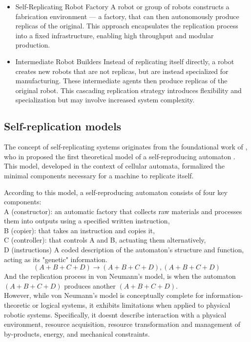 \begin{itemize}
    \item Self-Replicating Robot Factory
        A robot or group of robots constructs a fabrication environment — a factory, 
        that can then autonomously produce replicas of the original.
        This approach encapsulates the replication process into a fixed 
        infrastructure, enabling high throughput and modular production.
    \item Intermediate Robot Builders
        Instead of replicating itself directly, a robot creates new robots 
        that are not replicas, but are instead specialized for manufacturing. 
        These intermediate agents then produce replicas of the original robot. 
        This cascading replication strategy introduces flexibility and specialization 
        but may involve increased system complexity.

\end{itemize}




\subsection{Self-replication models}
The concept of self-replicating systems originates from the foundational work of 
\citeauthor{vonNeumann1962Theory}, who in \citeyear{vonNeumann1962Theory} proposed 
the first theoretical model of a self-reproducing automaton \cite{vonNeumann1962Theory}. 
This model, developed in the context of cellular automata, 
formalized the minimal components necessary for a machine to replicate itself.

According to this model, a self-reproducing automaton consists of four key components:\\
A (constructor): an automatic factory  that collects raw materials and processes them into outputs using a
specified written instruction, \\
B (copier): that takes an instruction and copies it,\\
C (controller): that controls A and B, actuating them alternatively,\\
D (instructions) A coded description of the automaton's structure and function, acting as its "genetic" information.\\
\[ (A + B + C + D) \rightarrow (A + B + C + D), (A + B + C + D) \]
And the replication process in von Neumann’s model, is when the automaton 
$ (A + B + C + D) $ produces another $ (A + B + C + D) $.\\
However, while von Neumann's model is conceptually complete for information-theoretic 
or logical systems, it exhibits limitations when applied to physical robotic systems. 
Specifically, it doesnt describe interaction with a physical environment, resource acquisition,
resource transformation and management of by-products, energy, and mechanical constraints.

